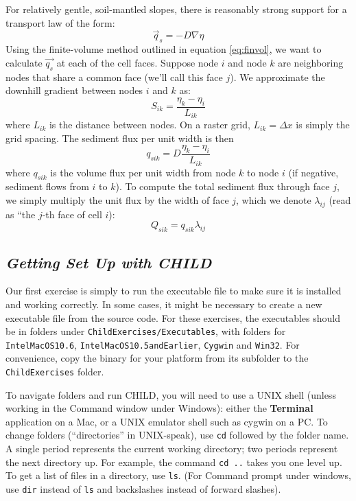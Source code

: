 \documentclass[12pt]{amsart}
\begin{document}
For relatively gentle, soil-mantled slopes, there is reasonably strong support for a transport law of the form:
\begin{equation}
\vec{q}_s = -D \nabla \eta
\end{equation}
Using the finite-volume method outlined in equation \ref{eq:finvol}, we want to calculate $\vec{q_s}$ at each of the cell faces. Suppose node $i$ and node $k$ are neighboring nodes that share a common face (we'll call this face $j$). We approximate the downhill gradient between nodes $i$ and $k$ as:
\begin{equation}
S_{ik} = \frac{\eta_k - \eta_i}{L_{ik}}
\end{equation} 
where $L_{ik}$ is the distance between nodes. On a raster grid, $L_{ik} = \Delta x$ is simply the grid spacing. The sediment flux per unit width is then
\begin{equation}
q_{sik} = D \frac{\eta_k - \eta_i}{L_{ik}}
\end{equation} 
where $q_{sik}$ is the volume flux per unit width from node $k$ to node $i$ (if negative, sediment flows from $i$ to $k$). To compute the total sediment flux through face $j$, we simply multiply the unit flux by the width of face $j$, which we denote $\lambda_{ij}$ (read as ``the $j$-th face of cell $i$):
\begin{equation}
Q_{sik} = q_{sik} \lambda_{ij}
\end{equation}


\subsection*{\em Getting Set Up with CHILD}

Our first exercise is simply to run the executable file to make sure it is installed and working correctly. In some cases, it might be necessary to create a new executable file from the source code. For these exercises, the executables should be in folders under {\tt ChildExercises/Executables}, with folders for {\tt IntelMacOS10.6}, {\tt IntelMacOS10.5andEarlier}, {\tt Cygwin} and {\tt Win32}. For convenience, copy the binary for your platform from its subfolder to the {\tt ChildExercises} folder.

To navigate folders and run CHILD, you will need to use a UNIX shell (unless working in the Command window under Windows): either the {\bf Terminal} application on a Mac, or a UNIX emulator shell such as cygwin on a PC. To change folders (``directories'' in UNIX-speak), use {\tt cd} followed by the folder name. A single period represents the current working directory; two periods represent the next directory up. For example, the command {\tt cd ..} takes you one level up. To get a list of files in a directory, use {\tt ls}. (For Command prompt under windows, use {\tt dir} instead of {\tt ls} and backslashes instead of forward slashes).
\end{document}
